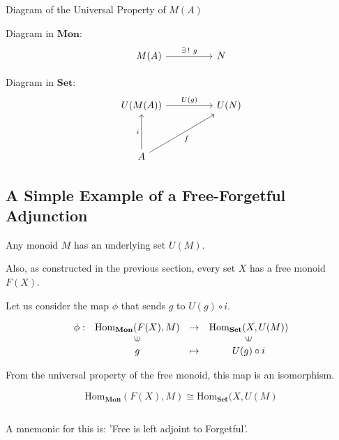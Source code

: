\documentclass[uplatex,a4j,12pt,dvipdfmx]{jsarticle}
\begin{document}
\begin{itembox}[l]{Diagram of the Universal Property of $M(A)$}

	Diagram in $\mathbf{Mon}$:
	\[
		\begin{tikzcd}
			M(A) \arrow[rr, "\exists \ \! ! \ g"] & & N
		\end{tikzcd}
	\]

	Diagram in $\mathbf{Set}$:
	\[
		\begin{tikzcd}
			U(M(A)) \arrow[rr, "U(g)"] & & U(N) \\
			& & \\
			A \arrow[uu, "i"] \arrow[rruu, "f"'] & &
		\end{tikzcd}
	\]

\end{itembox}





\subsection{A Simple Example of a Free-Forgetful Adjunction}

Any monoid $M$ has an underlying set $U(M)$.

Also, as constructed in the previous section, every set $X$ has a free monoid $F(X)$.

Let us consider the map $\phi$ that sends $g$ to $U(g) \circ i$.

\[
	\begin{array}{cccc}
		\phi : & \mathrm{Hom}_{\mathbf{Mon}}(F(X), M) & \to     & \mathrm{Hom}_{\mathbf{Set}}(X, U(M)) \\
		       & \rotatebox{90}{${\in}$}              &         & \rotatebox{90}{${\in}$}              \\
		       & g                                    & \mapsto & U(g) \circ i
	\end{array}
\]

From the universal property of the free monoid, this map is an isomorphism.

$$
	\mathrm{Hom}_{\mathbf{Mon}}(F(X), M) \cong \mathrm{Hom}_{\mathbf{Set}}(X, U(M)
$$

${}$

A mnemonic for this is: 'Free is left adjoint to Forgetful'.
\end{document}
